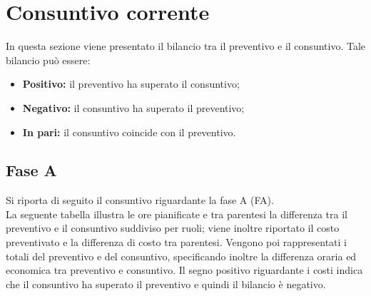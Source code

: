 \pagebreak
\section{Consuntivo corrente}
\label{Consuntivo}
In questa sezione viene presentato il bilancio tra il preventivo e il consuntivo.
Tale bilancio può essere:
\begin{itemize}
	\item \textbf{Positivo:} il preventivo ha superato il consuntivo;
	\item \textbf{Negativo:} il consuntivo ha superato il preventivo;
	\item \textbf{In pari:} il consuntivo coincide con il preventivo.
\end{itemize}
\subsection{Fase A}
\label{ConsuntivoAnalisi}
	Si riporta di seguito il consuntivo riguardante la fase A (FA).
	\\ La seguente tabella illustra le ore pianificate e tra parentesi la differenza tra il preventivo e il consuntivo suddiviso per ruoli; viene inoltre riportato il costo preventivato e la differenza di costo tra parentesi. Vengono poi rappresentati i totali del preventivo e del consuntivo, specificando inoltre la differenza oraria ed economica tra preventivo e consuntivo. Il segno positivo riguardante i costi indica che il consuntivo ha superato il preventivo e quindi il bilancio è negativo.
	
